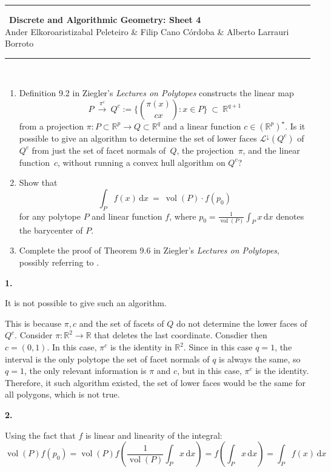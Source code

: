 \documentclass[10pt,a4paper]{article}
\DeclareMathOperator{\vol}{vol}
\newcommand{\RR}{\mathbb{R}}
\theoremstyle{plain}
\theoremstyle{remark}
\theoremstyle{definition}
\begin{document}
\thispagestyle{plain}
\begin{center}
\rule{\linewidth}{0.05mm}\
{\Large \textbf{Discrete and Algorithmic Geometry: Sheet 4\\}}
{\large Ander Elkoroaristizabal Peleteiro \& Filip Cano Córdoba \& Alberto Larrauri Borroto\\}
\rule{\linewidth}{0.05mm}\
\end{center}

\begin{enumerate}
	\item Definition 9.2 in Ziegler's \emph{Lectures on Polytopes} constructs the linear map
	\[
	P
	\ \xrightarrow{\pi^c}\ 
	Q^c :=
	\Big\{ \binom{\pi(x)}{cx} : x\in P\Big\}
	\ \subset \
	\RR^{q+1}
	\]
	from a projection $\pi:P\subset\RR^p\to Q\subset\RR^q$ and a linear function $c\in(\RR^p)^\star$.
	Is it possible to give an algorithm to determine the set of lower faces 
	$\mathcal L^\downarrow(Q^c)$ of $Q^c$ 
	from just the set of facet normals of~$Q$, 
	the projection~$\pi$, and the linear function~$c$, without running a convex hull algorithm on $Q^c$?
	
	\bigskip\bigskip
	\item Show that
	\[
	\int_P f(x)\,\text{d}x
	\ = \
	\vol(P) \cdot f(p_0)
	\]
	for any polytope $P$ and linear function $f$, 
	where $p_0 = \frac{1}{\vol(P)}\int_P x\,\text{d}x$ denotes the barycenter of $P$.
	\bigskip\bigskip
	\item Complete the proof of Theorem 9.6 in Ziegler's \emph{Lectures on Polytopes}, 
	possibly referring to \cite{bs-1992}.
	
\end{enumerate}


\textbf{1.}

It is not possible to give such an algorithm.

This is because $\pi,c$ and the set of facets of $Q$ do not determine the lower faces of $Q^c$.
Consider $\pi:\RR^2\to \RR$ that deletes the last coordinate. 
Consdier then $c=(0,1)$. 
In this case, $\pi^c$ is the identity in $\RR^2$.
Since in this case $q=1$, the interval is the only polytope the set of facet normals of $q$ is always the same,
so $q=1$, the only relevant information is $\pi$ and $c$, but in this case, $\pi^c$ is the identity.
Therefore, it such algorithm existed, the set of lower faces would be the same for all polygons,
which is not true.

\textbf{2.}

Using the fact that $f$ is linear and linearity of the integral:
\begin{equation}
	\vol(P) f(p_0)
	= \vol(P) f\left( \frac1{\vol (P)}\int_P x\,\mathrm{d}x \right)
	= f\left(\int_P x\,\mathrm{d}x \right) 
	= \int_P f(x) \,\mathrm{d}x
\end{equation}
\end{document}
